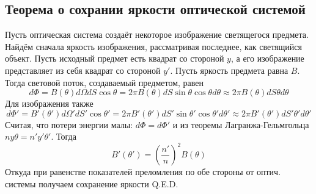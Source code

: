 \subsection{Теорема о сохрании яркости оптической системой}
Пусть оптическая система создаёт некоторое изображение светящегося предмета. \\
Найдём сначала яркость изображения, рассматривая последнее, как светящийся объект. Пусть исходный предмет есть квадрат со стороной $y$, а его изображение представляет из себя квадрат со стороной $y'$. Пусть яркость предмета равна $B$. Тогда световой поток, создаваемый предметом, равен
$$d\Phi = B(\theta)d\Omega d S \cos \theta = 2\pi B(\theta) dS\sin\theta\cos\theta d\theta \approx 2\pi B(\theta)dS \theta d \theta$$
Для изображения также
$$d\Phi'= B'(\theta')d\Omega' d S' \cos \theta' = 2\pi B'(\theta') dS'\sin\theta'\cos\theta' d\theta' \approx 2\pi B'(\theta')dS' \theta' d \theta'$$
Считая, что потери энергии малы: $d\Phi = d \Phi'$ и из теоремы Лагранжа-Гельмгольца $ny\theta = n'y'\theta'$.
Тогда 
$$B'(\theta') = \left(\frac{n'}{n}\right)^2 B(\theta)$$
Откуда при равенстве показателей преломления по обе стороны от оптич. системы получаем сохранение яркости Q.E.D.